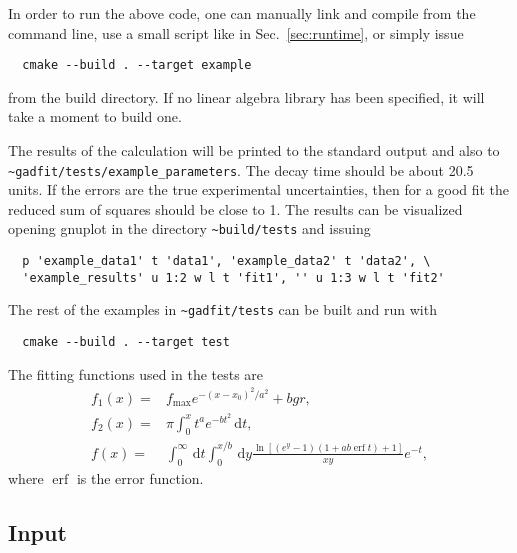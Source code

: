 \documentclass{article}
\newcommand{\D}{\,\textrm{d}}
\DeclareMathOperator{\erf}{erf}
\begin{document}
In order to run the above code, one can manually link and compile from the command line, use a small script like in Sec.~\ref{sec:runtime}, or simply issue
\begin{verbatim}
  cmake --build . --target example
\end{verbatim}
from the build directory. If no linear algebra library has been specified, it will take a moment to build one.

The results of the calculation will be printed to the standard output and also to \verb+~gadfit/tests/example_parameters+. The decay time should be about 20.5 units. If the errors are the true experimental uncertainties, then for a good fit the reduced sum of squares should be close to 1. The results can be visualized opening gnuplot in the directory \verb+~build/tests+ and issuing
\begin{verbatim}
  p 'example_data1' t 'data1', 'example_data2' t 'data2', \
  'example_results' u 1:2 w l t 'fit1', '' u 1:3 w l t 'fit2'
\end{verbatim}
The rest of the examples in \verb+~gadfit/tests+ can be built and run with
\begin{verbatim}
  cmake --build . --target test
\end{verbatim}
The fitting functions used in the tests are
\begin{equation*}
  \begin{split}
    f_1(x) =& f_{\text{max}}e^{-(x-x_0)^2/a^2}+bgr, \\
    f_2(x) =& \pi \int_0^x t^ae^{-bt^2} \D t, \\
    f(x) =& \int_0^\infty \D t \int_0^{x/b} \D y
    \frac{\ln[(e^y-1)(1+ab \erf t)+1]}{xy} e^{-t},
  \end{split}
\end{equation*}
where $\erf$ is the error function.

\subsection{\label{sec:input}Input}
\end{document}
